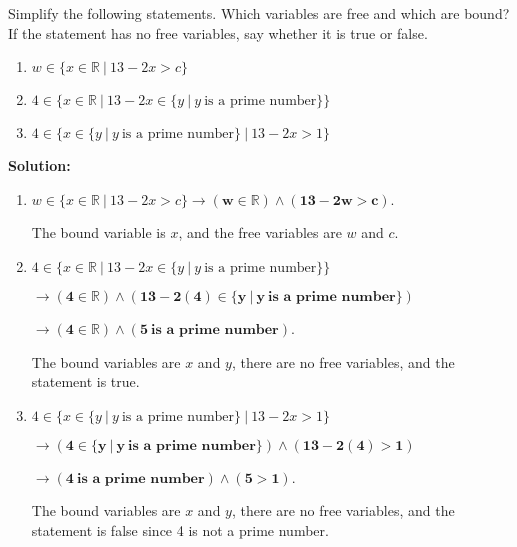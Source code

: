 Simplify the following statements. Which variables are free and which are bound? If the statement has no free variables, say whether it is true or false.
\begin{enumerate}[label=(\alph*)]
    \item $w \in \{x \in \mathbb{R} \ | \ 13-2x > c \}$
    \item $4 \in \{x \in \mathbb{R} \ | \ 13-2x \in \{y \ | \ y \ \text{is a prime number} \} \}$
    \item $4 \in \{x \in  \{y \ | \ y \ \text{is a prime number} \} \ | \ 13-2x > 1 \}$
\end{enumerate}

\textbf{Solution:}
\begin{enumerate}[label=(\alph*)]
    \item $w \in \{x \in \mathbb{R} \ | \ 13-2x > c \} \rightarrow \bm{(w \in \mathbb{R}) \wedge (13-2w > c)}$.
    
    The bound variable is $x$, and the free variables are $w$ and $c$.
    
    \item $4 \in \{x \in \mathbb{R} \ | \ 13-2x \in \{y \ | \ y \ \text{is a prime number} \} \}$
    
    $\rightarrow \bm{(4 \in \mathbb{R}) \wedge (13-2(4) \in \{y \ | \ y \ \text{is a prime number} \})}$
    
    $\rightarrow \bm{(4 \in \mathbb{R}) \wedge (5 \ \text{is a prime number})}$.
    
    The bound variables are $x$ and $y$, there are no free variables, and the statement is true.
    
    \item $4 \in \{x \in  \{y \ | \ y \ \text{is a prime number} \} \ | \ 13-2x > 1 \}$
    
    $\rightarrow \bm{(4 \in \{y \ | \ y \ \text{is a prime number} \}) \wedge (13-2(4) > 1)}$
    
    $\rightarrow \bm{(4 \ \text{is a prime number}) \wedge (5 > 1)}$.
    
    The bound variables are $x$ and $y$, there are no free variables, and the statement is false since 4 is not a prime number.
    
\end{enumerate}

\pagebreak